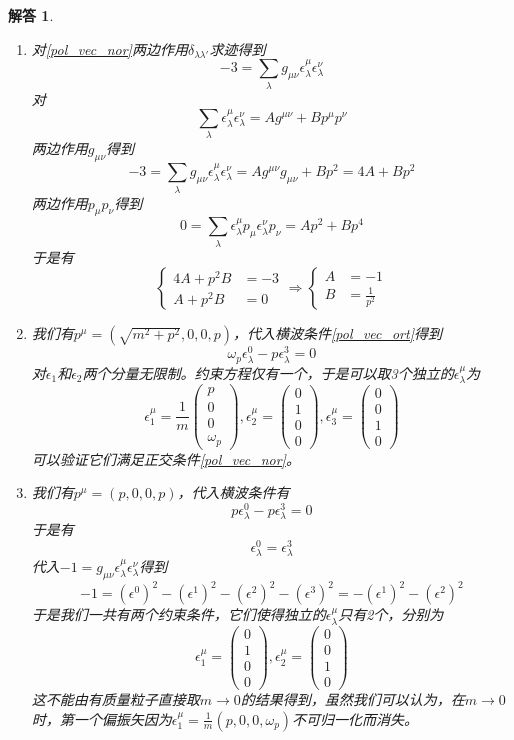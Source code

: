 \documentclass[a4paper,11pt]{ctexart}
\newtheorem{ans}{解答}[section]
\newcommand{\beq}{\begin{equation}}
\newcommand{\eeq}{\end{equation}}
\newcommand{\mat}[1]{\begin{pmatrix} #1 \end{pmatrix}}
\begin{document}
\begin{ans}
\begin{enumerate}
\item
对\cref{pol_vec_nor}两边作用$\delta_{\lambda \lambda'}$求迹得到
\beq
-3 = \sum_\lambda g_{\mu \nu} \epsilon^\mu_\lambda \epsilon^\nu_\lambda
\eeq
对
\beq
\sum_\lambda \epsilon_\lambda^\mu \epsilon_\lambda^\nu = Ag^{\mu \nu} + B p^\mu p^\nu
\eeq
两边作用$g_{\mu \nu}$得到
\beq
-3= \sum_\lambda g_{\mu \nu} \epsilon^\mu_\lambda \epsilon^\nu_\lambda = Ag^{\mu \nu} g_{\mu \nu} + Bp^2 = 4A + Bp^2
\eeq
两边作用$p_\mu p_\nu$得到
\beq
0=\sum_\lambda \epsilon_\lambda^\mu p_\mu \epsilon_\lambda^\nu p_\nu = Ap^2 + Bp^4
\eeq
于是有
\beq
\begin{cases}
4A + p^2 B &= -3 \\
A + p^2 B &= 0
\end{cases}
\Rightarrow
\begin{cases}
A &= -1\\
B &= \frac{1}{p^2}
\end{cases}
\eeq

\item 我们有$p^\mu = (\sqrt{m^2 + p^2},0,0,p)$，代入横波条件\cref{pol_vec_ort}得到
\beq
\omega_p  \epsilon^0_\lambda - p \epsilon^3_\lambda = 0
\eeq
对$\epsilon_1$和$\epsilon_2$两个分量无限制。约束方程仅有一个，于是可以取3个独立的$\epsilon^\mu_\lambda$为
\beq
\epsilon^\mu_1 = \frac{1}{m} \mat{p\\0 \\0 \\ \omega_p}, \epsilon^\mu_2 = \mat{0 \\ 1 \\0 \\0}, \epsilon^\mu_3 = \mat{0 \\ 0 \\ 1 \\0}
\eeq
可以验证它们满足正交条件\cref{pol_vec_nor}。

\item 我们有$p^\mu = (p,0,0,p)$，代入横波条件有
\beq
p\epsilon^0_\lambda - p \epsilon^3_\lambda = 0
\eeq
于是有
\beq
\epsilon^0_\lambda = \epsilon^3_\lambda
\eeq
代入$-1 = g_{\mu \nu} \epsilon^\mu_\lambda \epsilon^\nu_\lambda$得到
\beq
-1 = (\epsilon^0)^2 - (\epsilon^1)^2 - (\epsilon^2)^2 - (\epsilon^3)^2 = - (\epsilon^1)^2 - (\epsilon^2)^2
\eeq
于是我们一共有两个约束条件，它们使得独立的$\epsilon^\mu_\lambda$只有2个，分别为
\beq
\epsilon^\mu_1 = \mat{0 \\ 1 \\0 \\0}, \epsilon^\mu_2 = \mat{0 \\ 0 \\ 1 \\0}
\eeq
这不能由有质量粒子直接取$m\to 0 $的结果得到，虽然我们可以认为，在$m \to 0$时，第一个偏振矢因为$\epsilon^\mu_1 = \frac{1}{m} (p,0,0,\omega_p)$不可归一化而消失。
\end{enumerate}
\end{ans}
\end{document}
